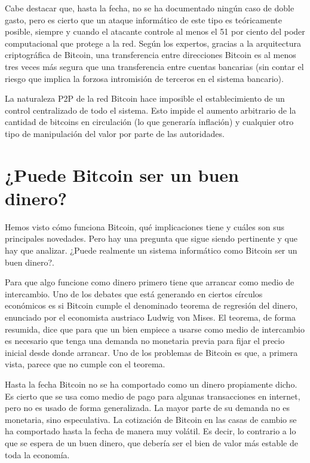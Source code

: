 \documentclass[12pt,letterpaper]{article}
\begin{document}
Cabe destacar que, hasta la fecha, no se ha documentado ningún caso de doble gasto, pero es cierto que un ataque informático de este tipo es teóricamente posible, siempre y cuando el atacante controle al menos el 51 por ciento del poder computacional que protege a la red. Según los expertos, gracias a la arquitectura criptográfica de Bitcoin, una transferencia entre direcciones Bitcoin es al menos tres veces más segura que una transferencia entre cuentas bancarias (sin contar el riesgo que implica la forzosa intromisión de terceros en el sistema bancario).

La naturaleza P2P de la red Bitcoin hace imposible el establecimiento de un control centralizado de todo el sistema.
Esto impide el aumento arbitrario de la cantidad de bitcoins en circulación (lo que generaría inflación) y cualquier otro tipo de manipulación del valor por parte de las autoridades.

\section*{¿Puede Bitcoin ser un buen dinero?}
Hemos visto cómo funciona Bitcoin, qué implicaciones tiene y cuáles son sus principales novedades. Pero hay una pregunta que sigue siendo pertinente y que hay que analizar. ¿Puede realmente un sistema informático como Bitcoin ser un buen dinero?.


Para que algo funcione como dinero primero tiene que arrancar como medio de intercambio. Uno de los debates que está generando en ciertos círculos económicos es si Bitcoin cumple el denominado teorema de regresión del dinero, enunciado por el economista austriaco Ludwig von Mises.
El teorema, de forma resumida, dice que para que un bien empiece a usarse como medio de intercambio es necesario que tenga una demanda no monetaria previa para fijar el precio inicial desde donde arrancar.
Uno de los problemas de Bitcoin es que, a primera vista, parece que no cumple con el teorema. 

Hasta la fecha Bitcoin no se ha comportado como un dinero propiamente dicho. Es cierto que se usa como medio de pago para algunas transacciones en internet, pero no es usado de forma generalizada. 
La mayor parte de su demanda no es monetaria, sino especulativa. La cotización de Bitcoin en las casas de cambio se ha comportado hasta la fecha de manera muy  volátil. Es decir, lo contrario a lo que se espera de un buen dinero, que debería ser el bien de valor más estable de toda la economía.  
\end{document}
